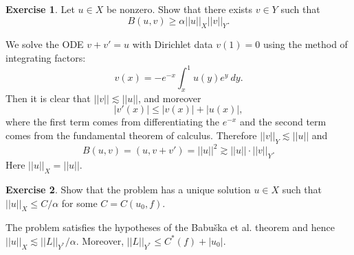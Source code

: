 \documentclass[10pt]{article}
\theoremstyle{definition}
\newtheorem{exer}{Exercise}
\begin{document}
\begin{exer}
Let $u \in X$ be nonzero. Show that there exists $v \in Y$ such that 
$$B(u, v) \geq \alpha ||u||_X ||v||_Y.$$
\end{exer}

We solve the ODE $v + v' = u$ with Dirichlet data $v(1) = 0$ using the method of integrating factors:
$$v(x) = -e^{-x} \int_x^1 u(y) e^y ~d y.$$
Then it is clear that $||v|| \lesssim ||u||$, and moreover
$$|v'(x)| \leq |v(x)| + |u(x)|,$$
where the first term comes from differentiating the $e^{-x}$ and the second term comes from the fundamental theorem of calculus.
Therefore $||v||_Y \lesssim ||u||$ and 
$$B(u, v) = (u, v + v') = ||u||^2 \gtrsim ||u|| \cdot ||v||_Y.$$
Here $||u||_X = ||u||$.

\begin{exer}
Show that the problem has a unique solution $u \in X$ such that $||u||_X \leq C/\alpha$ for some $C = C(u_0, f)$.
\end{exer}

The problem satisfies the hypotheses of the Babuška et al. theorem and hence $||u||_X \lesssim ||L||_{Y^*}/\alpha$.
Moreover, $||L||_{Y^*} \leq C^*(f) + |u_0|$.
\end{document}

